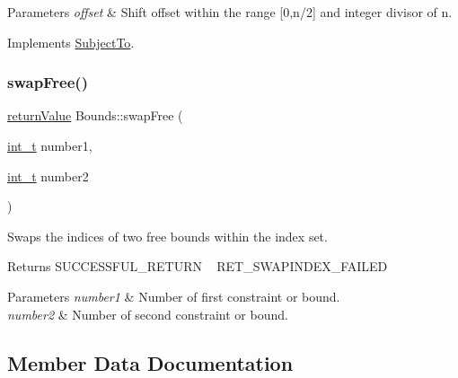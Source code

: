 \begin{DoxyParams}{Parameters}
{\em offset} & Shift offset within the range \mbox{[}0,n/2\mbox{]} and integer divisor of n. \\
\hline
\end{DoxyParams}


Implements \hyperlink{class_subject_to_af584328614003c2b9e92b185c6ceedc9}{Subject\+To}.

\mbox{\label{class_bounds_a8fb8a0534a0a112e227aa073d82d56de}} 
\subsubsection{\texorpdfstring{swap\+Free()}{swapFree()}}
{\footnotesize\ttfamily \hyperlink{_message_handling_8hpp_a81d556f613bfbabd0b1f9488c0fa865e}{return\+Value} Bounds\+::swap\+Free (\begin{DoxyParamCaption}\item[{\hyperlink{_types_8hpp_ab6fd6105e64ed14a0c9281326f05e623}{int\+\_\+t}}]{number1,  }\item[{\hyperlink{_types_8hpp_ab6fd6105e64ed14a0c9281326f05e623}{int\+\_\+t}}]{number2 }\end{DoxyParamCaption})}

Swaps the indices of two free bounds within the index set. \begin{DoxyReturn}{Returns}
S\+U\+C\+C\+E\+S\+S\+F\+U\+L\+\_\+\+R\+E\+T\+U\+RN ~\newline
 R\+E\+T\+\_\+\+S\+W\+A\+P\+I\+N\+D\+E\+X\+\_\+\+F\+A\+I\+L\+ED 
\end{DoxyReturn}

\begin{DoxyParams}{Parameters}
{\em number1} & Number of first constraint or bound. \\
\hline
{\em number2} & Number of second constraint or bound. \\
\hline
\end{DoxyParams}


\subsection{Member Data Documentation}
\mbox{\label{class_bounds_a7c4780c7710eec138bd4def344cedd69}} 
